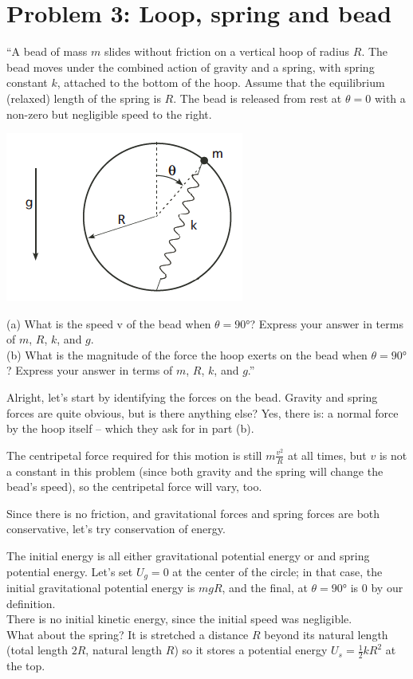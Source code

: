 \documentclass[12pt,a4paper]{report}
\begin{document}
\section{Problem 3: Loop, spring and bead}

``A bead of mass $m$ slides without friction on a vertical hoop of radius $R$. The bead moves under the combined action of gravity and a spring, with spring constant $k$, attached to the bottom of the hoop. Assume that the equilibrium (relaxed) length of the spring is $R$. The bead is released from rest at $\theta = 0$ with a non-zero but negligible speed to the right.

\begin{center}
\includegraphics[scale=0.8]{Graphics/h5p3}
\end{center}

(a) What is the speed v of the bead when $\theta = \ang{90}$? Express your answer in terms of $m$, $R$, $k$, and $g$.\\
(b) What is the magnitude of the force the hoop exerts on the bead when $\theta = \ang{90}$? Express your answer in terms of $m$, $R$, $k$, and $g$.''

Alright, let's start by identifying the forces on the bead. Gravity and spring forces are quite obvious, but is there anything else? Yes, there is: a normal force by the hoop itself -- which they ask for in part (b).

The centripetal force required for this motion is still $m \frac{v^2}{R}$ at all times, but $v$ is not a constant in this problem (since both gravity and the spring will change the bead's speed), so the centripetal force will vary, too.





Since there is no friction, and gravitational forces and spring forces are both conservative, let's try conservation of energy.

The initial energy is all either gravitational potential energy or and spring potential energy. Let's set $U_g = 0$ at the center of the circle; in that case, the initial gravitational potential energy is $m g R$, and the final, at $\theta = \ang{90}$ is $0$ by our definition.\\
There is no initial kinetic energy, since the initial speed was negligible.\\
What about the spring? It is stretched a distance $R$ beyond its natural length (total length $2 R$,  natural length $R$) so it stores a potential energy $U_s = \frac{1}{2} k R^2$ at the top.
\end{document}
